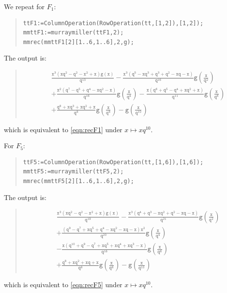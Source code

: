 \documentclass[ALCO,Unicode,published]{cedram}
\begin{document}
We repeat for $F_1$:
\begin{quote}
\begin{verbatim}
ttF1:=ColumnOperation(RowOperation(tt,[1,2]),[1,2]);
mmttF1:=murraymiller(ttF1,2);
mmrec(mmttF1[2][1..6,1..6],2,g);
\end{verbatim}
\end{quote}
The output is:
\begin{quote}
\begin{align*}
&\mathtt{ 
{\frac {{x}^{3} \left( x{q}^{2}-{q}^{2}-{x}^{2}+x \right) g \left( x
 \right) }{{q}^{13}}}
 -{\frac {{x}^{3} \left( {q}^{5}-x{q}^{3}+{q}^{3}+
{q}^{2}-xq-x \right) }{{q}^{16}}g \left( {\frac {x}{{q}^{2}}} \right) 
}}\\
&\mathtt{+{\frac {{x}^{2} \left( {q}^{7}-{q}^{5}+{q}^{4}-x{q}^{2}-x \right) }{
{q}^{16}}g \left( {\frac {x}{{q}^{4}}} \right) }
-{\frac {x \left( {q}^
{6}+{q}^{5}-{q}^{4}+x{q}^{2}+x \right) }{{q}^{11}}g \left( {\frac {x}{
{q}^{6}}} \right) }}\\
&
\mathtt{+{\frac {{q}^{8}+x{q}^{3}+x{q}^{2}+x}{{q}^{8}}g
 \left( {\frac {x}{{q}^{8}}} \right) }-g \left( {\frac {x}{{q}^{10}}}
 \right)} 
\end{align*}
\end{quote}
which is equivalent to \eqref{eqn:recF1} under $x\mapsto xq^{10}$.

For $F_5$:
\begin{quote}
\begin{verbatim}
ttF5:=ColumnOperation(RowOperation(tt,[1,6]),[1,6]);
mmttF5:=murraymiller(ttF5,2);
mmrec(mmttF5[2][1..6,1..6],2,g);
\end{verbatim}
\end{quote}
The output is:
\begin{quote}
\begin{align*}
&\mathtt{{\frac {{x}^{3} \left( x{q}^{2}-{q}^{2}-{x}^{2}+x \right) g \left( x
 \right) }{{q}^{19}}}
 -{\frac {{x}^{3} \left( {q}^{4}+{q}^{3}-x{q}^{2}+
{q}^{2}-xq-x \right) }{{q}^{21}}g \left( {\frac {x}{{q}^{2}}} \right) 
}}\\
&\mathtt{+{\frac { \left( {q}^{9}-{q}^{7}+x{q}^{5}+{q}^{4}-x{q}^{2}-xq-x
 \right) {x}^{2}}{{q}^{20}}g \left( {\frac {x}{{q}^{4}}} \right) }
}\\
&\mathtt{ -{
\frac {x \left( {q}^{10}+{q}^{9}-{q}^{7}+x{q}^{5}+x{q}^{4}+x{q}^{3}-x
 \right) }{{q}^{16}}g \left( {\frac {x}{{q}^{6}}} \right) }}
\\
& \mathtt{+{\frac {{q
}^{8}+x{q}^{2}+xq+x}{{q}^{8}}g \left( {\frac {x}{{q}^{8}}} \right) }-g
 \left( {\frac {x}{{q}^{10}}} \right) 
} 
 \end{align*}
\end{quote}
which is equivalent to \eqref{eqn:recF5} under $x\mapsto xq^{10}$.
\end{document}
